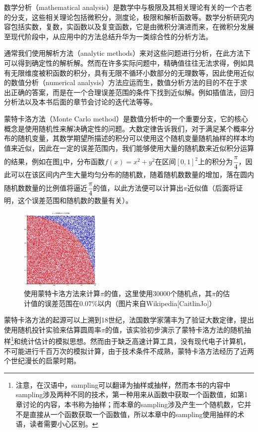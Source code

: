 数学分析（mathematical analysis）是数学中与极限及其相关理论有关的一个古老的分支，这些相关理论包括微积分，测度论，极限和解析函数等。数学分析研究内容包括实数，复数，实函数以及复变函数，它是由微积分演进而来，在微积分发展至现代阶段中，从应用中的方法总结升华为一类综合性的分析方法。

通常我们使用解析方法（analytic methods）来对这些问题进行分析，在此方法下可以得到确定性的解析解。然而在许多实际问题中，精确值往往无法求得，例如具有无限维度被积函数的积分，具有无限不循环小数部分的无理数等，因此使用近似的数值分析（numerical analysis）方法应运而生，数值分析方法的目的不在于求出正确的答案，而是在一个合理误差范围的条件下找到近似解。例如插值法，回归分析法以及本书后面的章节会讨论的迭代法等等。

蒙特卡洛方法（Monte Carlo method）是数值分析中的一个重要分支，它的核心概念是使用随机性来解决确定性的问题。大数定律告诉我们，对于满足某个概率分布的随机变量，其数学期望所描述的积分可以使用这个随机变量随机抽样的样本均值来近似，因此在一定的误差范围内，我们能够使用大量的随机数来近似积分运算的结果，例如在图\ref{f:mc-pi}中，分布函数$f(x)=x^2+y^2$在区间$[0,1]^2$上的积分为$ \cfrac{\pi}{4}$，因此可以在该区间内产生大量均匀分布的随机数，随着随机数数量的增加，落在圆内随机数数量的比例值将逼近$ \cfrac{\pi}{4}$的值，以此方法便可以计算出$\pi$近似值（后面将证明，这个误差范围和随机数的数量有关）。

\begin{figure}
	\sidecaption
	\includegraphics[width=0.35\textwidth]{figures/mc/pi}
	\caption{使用蒙特卡洛方法来计算$\pi$的值，这里使用30000个随机点，其$\pi$的估计值的误差范围在0.07\%以内（图片来自Wikipedia[CaitlinJo]）}
	\label{f:mc-pi}
\end{figure}

蒙特卡洛方法的起源可以上溯到18世纪，法国数学家蒲丰为了验证大数定律，提出使用随机投针实验来估算圆周率$\pi$的值，该实验初步演示了蒙特卡洛方法的随机抽样\footnote{注意，在汉语中，sampling可以翻译为抽样或抽样，然而本书的内容中sampling涉及两种不同的技术，第一种用来从函数中获取一个函数值，如第1章讨论的内容，本书称为抽样；而本章的sampling涉及产生一个随机数，它并不是直接从一个函数获取一个函数值，所以本章中的sampling使用抽样的术语，读者需要小心区别。}和统计估计的模拟思想。然而由于缺乏高速计算工具，没有现代电子计算机，不可能进行千百万次的模拟计算，由于技术条件不成熟，蒙特卡洛方法经历了近两个世纪漫长的启蒙时期。

